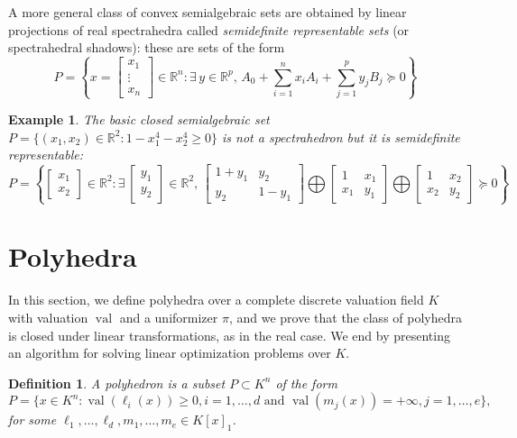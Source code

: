 \documentclass[a4paper,12pt]{article}
\newtheorem{definition}{Definition}
\newtheorem{example}{Example}
\newcommand{\R}{\mathbb{R}} %
\DeclareMathOperator{\val}{val}
\begin{document}
A more general class of convex semialgebraic sets are obtained by linear projections of real spectrahedra
called \emph{semidefinite representable sets} (or spectrahedral shadows): these are sets of the form
$$
P = \left\{x = \left[\begin{smallmatrix} x_1 \\ \vdots \\ x_n \end{smallmatrix}\right] \in \R^n : \exists\,y\in\R^p, \, A_0 + \sum_{i=1}^n x_i A_i + \sum_{j=1}^p y_j B_j \succeq 0\right\}
$$

\begin{example}
\label{fermat_quartic}
The basic closed semialgebraic set $P = \{(x_1,x_2) \in \R^2 : 1-x_1^4-x_2^4 \geq 0\}$ is not a spectrahedron
but it is semidefinite representable:
$$
P = \left\{\begin{bmatrix} x_1 \\ x_2 \end{bmatrix} \in \R^2 :
\exists\,
\begin{bmatrix} y_1 \\ y_2 \end{bmatrix} \in \R^2, \,
\begin{bmatrix}
  1+y_1 & y_2 \\
  y_2 & 1-y_1
\end{bmatrix}
\bigoplus
\begin{bmatrix}
  1 & x_1 \\
  x_1 & y_1
\end{bmatrix}
\bigoplus
\begin{bmatrix}
  1 & x_2 \\
  x_2 & y_2
\end{bmatrix}
\succeq 0
\right\}
$$
\end{example}


\section{Polyhedra}

In this section, we define polyhedra over a complete discrete valuation field $K$ with valuation $\val$ and a uniformizer $\pi$, and we prove that the class of polyhedra is closed under linear transformations, as in the real case. We end by presenting an algorithm for solving linear optimization problems over $K$.

\begin{definition}
  \label{def_polyhedra}
  A \emph{polyhedron} is a subset $P \subset K^n$ of the form
  $$
  P = \{x \in K^n : \val(\ell_i(x)) \geq 0, i=1,\ldots,d \text{ and }
  \val(m_j(x)) = +\infty, j=1,\ldots,e\},
  $$
  for some $\ell_1,\ldots,\ell_d,m_1,\ldots,m_e \in K[x]_1$.
\end{definition}
\end{document}
